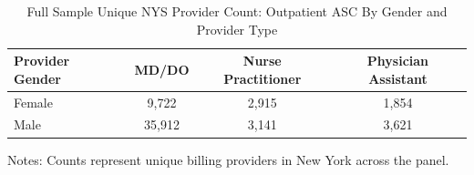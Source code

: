 \documentclass{article}
\begin{document}
\begin{table}[htbp]
\centering
\caption{Full Sample Unique NYS Provider Count: Outpatient ASC By Gender and Provider Type}
\label{tab:outpatient_gender_x_provtype_full}
\begin{threeparttable}
\begin{tabular}{lccc}
\toprule
\textbf{Provider Gender} & \textbf{MD/DO} & \textbf{Nurse Practitioner} & \textbf{Physician Assistant} \\
\midrule
        Female & 9,722 & 2,915 & 1,854 \\
        Male & 35,912 & 3,141 & 3,621 \\
\bottomrule
\end{tabular}
\begin{tablenotes}[flushleft]
\footnotesize
\item Notes: Counts represent unique billing providers in New York across the panel.
\end{tablenotes}
\end{threeparttable}
\end{table}
\end{document}
